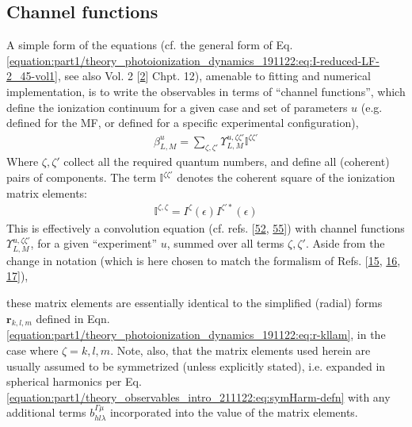 \documentclass[letterpaper,table,10pt,english]{jupyterBook}
\begin{document}
\subsection{Channel functions}
\label{\detokenize{part1/theory_tensor_formalism_201122:channel-functions}}\label{\detokenize{part1/theory_tensor_formalism_201122:sec-channel-funcs}}
\sphinxAtStartPar
A simple form of the equations (cf. the general form of Eq. \eqref{equation:part1/theory_photoionization_dynamics_191122:eq:I-reduced-LF-2_45-vol1}, see also  Vol. 2 {[}\hyperlink{cite.backmatter/bibliography:id614}{2}{]} Chpt. 12), amenable to fitting and numerical implementation, is to write the observables in terms of “channel functions”, which define the ionization continuum for a given case and set of parameters \(u\) (e.g. defined for the MF, or defined for a specific experimental configuration),
\begin{equation}\label{equation:part1/theory_tensor_formalism_201122:eqn:channel-fns}
\begin{split}\beta_{L,M}^{u}=\sum_{\zeta,\zeta'}\varUpsilon_{L,M}^{u,\zeta\zeta'}\mathbb{I}^{\zeta\zeta'}\end{split}
\end{equation}
\sphinxAtStartPar
Where \(\zeta,\zeta'\) collect all the required quantum numbers, and
define all (coherent) pairs of components. The term
\(\mathbb{I}^{\zeta\zeta'}\) denotes the coherent square of the ionization
matrix elements:
\begin{equation}\label{equation:part1/theory_tensor_formalism_201122:eqn:I-zeta}
\begin{split}\mathbb{I}^{\zeta,\zeta}=I^{\zeta}(\epsilon)I^{\zeta'*}(\epsilon)
\end{split}
\end{equation}
\sphinxAtStartPar
This is effectively a convolution equation (cf. refs. {[}\hyperlink{cite.backmatter/bibliography:id754}{52}, \hyperlink{cite.backmatter/bibliography:id575}{55}{]}) with channel functions \(\varUpsilon_{L,M}^{u,\zeta\zeta'}\), for a given “experiment” \(u\), summed over all terms \(\zeta,\zeta'\). Aside from the change in notation (which is here chosen to match the formalism of Refs. {[}\hyperlink{cite.backmatter/bibliography:id693}{15}, \hyperlink{cite.backmatter/bibliography:id567}{16}, \hyperlink{cite.backmatter/bibliography:id725}{17}{]}),

\sphinxAtStartPar
these matrix elements are essentially identical to the simplified (radial) forms
\(\mathbf{r}_{k,l,m}\) defined in Eqn. \eqref{equation:part1/theory_photoionization_dynamics_191122:eq:r-kllam}, in the case where \(\zeta=k,l,m\). Note, also, that the matrix elements used herein are usually assumed to be symmetrized (unless explicitly stated), i.e. expanded in spherical harmonics per Eq. \eqref{equation:part1/theory_observables_intro_211122:eq:symHarm-defn} with any additional terms \(b_{hl\lambda}^{\Gamma\mu}\) incorporated into the value of the matrix elements.
\end{document}
